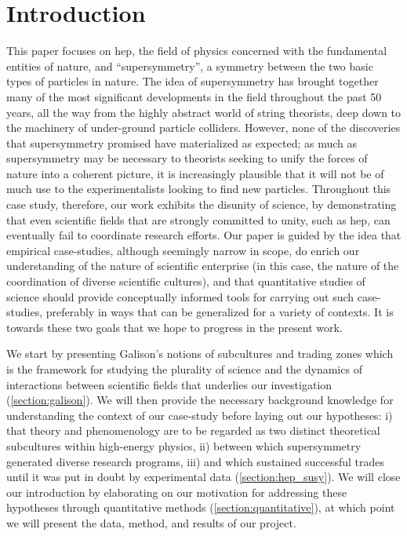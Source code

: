 \documentclass[smallextended]{svjour3}
\begin{document}


\section{Introduction}
\label{section:introduction}

This paper focuses on \gls{hep}, the field of physics concerned with the fundamental entities of nature, and ``supersymmetry'', a symmetry between the two basic types of particles in nature. The idea of supersymmetry has brought together many of the most significant developments in the field throughout the past 50 years, all the way from the highly abstract world of string theorists, deep down to the machinery of under-ground particle colliders. However, none of the discoveries that supersymmetry promised have materialized as expected; as much as supersymmetry may be necessary to theorists seeking to unify the forces of nature into a coherent picture, it is increasingly plausible that it will not be of much use to the experimentalists looking to find new particles. Throughout this case study, therefore, our work exhibits the disunity of science, by demonstrating that even scientific fields that are strongly committed to unity, such as \gls{hep}, can eventually fail to coordinate research efforts. Our paper is guided by the idea that empirical case-studies, although seemingly narrow in scope, do enrich our understanding of the nature of scientific enterprise (in this case, the nature of the coordination of diverse scientific cultures), and that quantitative studies of science should provide conceptually informed tools for carrying out such case-studies, preferably in ways that can be generalized for a variety of contexts. It is towards these two goals that we hope to progress in the present work. 

We start by presenting Galison's notions of subcultures and trading zones which is the framework for studying the plurality of science and the dynamics of interactions between scientific fields that underlies our investigation 
(\ref{section:galison}). We will then provide the necessary background knowledge for understanding the context of our case-study before laying out our hypotheses: i) that theory and phenomenology are to be regarded as two distinct theoretical subcultures within high-energy physics, ii) between which supersymmetry generated diverse research programs, iii) and which sustained successful trades until it was put in doubt by experimental data (\ref{section:hep_susy}). We will close our introduction by elaborating on our motivation for addressing these hypotheses through quantitative methods (\ref{section:quantitative}), at which point we will present the data, method, and results of our project.
\end{document}
